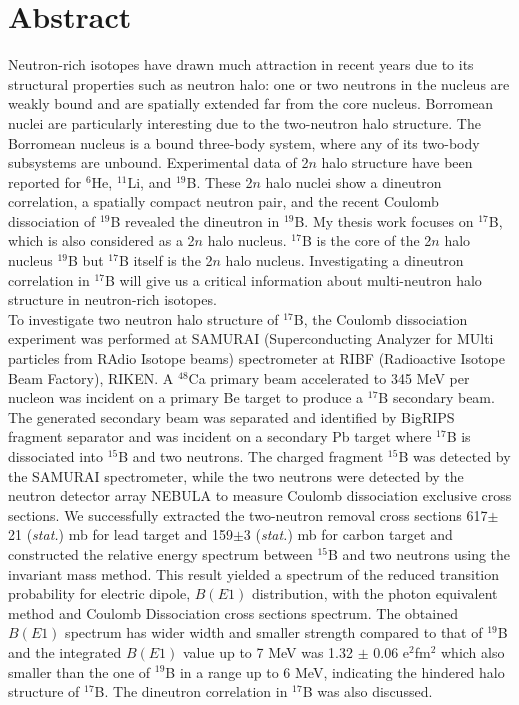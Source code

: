 \documentclass[11pt]{book}
\begin{document}
\chapter*{Abstract}
Neutron-rich isotopes have drawn much attraction in recent years due to its structural properties such as neutron halo: one or two neutrons in the nucleus are weakly bound and are spatially extended far from the core nucleus. Borromean nuclei are particularly interesting due to the two-neutron halo structure. The Borromean nucleus is a bound three-body system, where any of its two-body subsystems are unbound. Experimental data of 2$n$ halo structure have been reported for ${}^{6}$He, ${}^{11}$Li, and ${}^{19}$B. These 2$n$ halo nuclei show a dineutron correlation, a spatially compact neutron pair, and the recent Coulomb dissociation of ${}^{19}$B revealed the dineutron in ${}^{19}$B. My thesis work focuses on ${}^{17}$B, which is also considered as a 2$n$ halo nucleus. ${}^{17}$B is the core of the 2$n$ halo nucleus ${}^{19}$B but ${}^{17}$B itself is the 2$n$ halo nucleus. Investigating a dineutron correlation in ${}^{17}$B will give us a critical information about multi-neutron halo structure in neutron-rich isotopes.\\
To investigate two neutron halo structure of ${}^{17}$B, the Coulomb dissociation experiment was performed at SAMURAI (Superconducting Analyzer for MUlti particles from RAdio Isotope beams) spectrometer at RIBF (Radioactive Isotope Beam Factory), RIKEN. A $^{48}$Ca primary beam accelerated to 345 MeV per nucleon was incident on a primary Be target to produce a ${}^{17}$B secondary beam. The generated secondary beam was separated and identified by BigRIPS fragment separator and was incident on a secondary Pb target where ${}^{17}$B is dissociated into $^{15}$B and two neutrons. The charged fragment $^{15}$B was detected by the SAMURAI spectrometer, while the two neutrons were detected by the neutron detector array NEBULA to measure Coulomb dissociation exclusive cross sections. We successfully extracted the two-neutron removal cross sections 617$\pm$21 (\textit{stat.}) mb for lead target and 159$\pm$3 (\textit{stat.}) mb for carbon target and constructed the relative energy spectrum between $^{15}$B and two neutrons using the invariant mass method. This result yielded a spectrum of the reduced transition probability for electric dipole, $B(E1)$ distribution, with the photon equivalent method and Coulomb Dissociation cross sections spectrum. The obtained $B(E1)$ spectrum has wider width and smaller strength compared to that of $^{19}$B and the integrated $B(E1)$ value up to 7 MeV was 1.32 $\pm$ 0.06 e$^2$fm$^2$ which also smaller than the one of $^{19}$B in a range up to 6 MeV, indicating the hindered halo structure of $^{17}$B. The dineutron correlation in $^{17}$B was also discussed.
\clearpage
\end{document}

